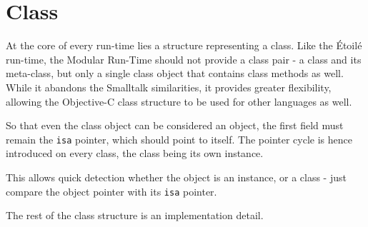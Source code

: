 \section{Class}

At the core of every run-time lies a structure representing a class. Like the \'Etoil\'e run-time, the Modular Run-Time should not provide a class pair - a class and its meta-class, but only a single class object that contains class methods as well. While it abandons the Smalltalk similarities, it provides greater flexibility, allowing the Objective-C class structure to be used for other languages as well.

So that even the class object can be considered an object, the first field must remain the \verb=isa= pointer, which should point to itself. The pointer cycle is hence introduced on every class, the class being its own instance.

This allows quick detection whether the object is an instance, or a class - just compare the object pointer with its \verb=isa= pointer.

The rest of the class structure is an implementation detail.




